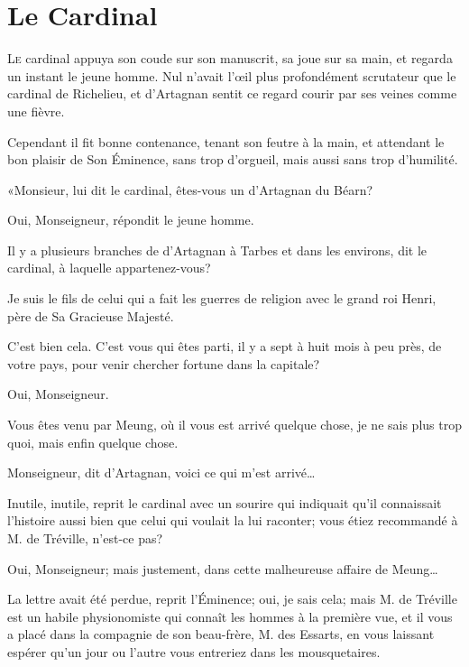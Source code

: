 
\chapter{Le Cardinal}

\lettrine{L}{e} cardinal appuya son coude sur son manuscrit, sa joue sur sa main, et regarda un instant le jeune homme. Nul n'avait l'œil plus profondément scrutateur que le cardinal de Richelieu, et d'Artagnan sentit ce regard courir par ses veines comme une fièvre. 

Cependant il fit bonne contenance, tenant son feutre à la main, et attendant le bon plaisir de Son Éminence, sans trop d'orgueil, mais aussi sans trop d'humilité. 

«Monsieur, lui dit le cardinal, êtes-vous un d'Artagnan du Béarn? 

\speak  Oui, Monseigneur, répondit le jeune homme. 

\speak  Il y a plusieurs branches de d'Artagnan à Tarbes et dans les environs, dit le cardinal, à laquelle appartenez-vous? 

\speak  Je suis le fils de celui qui a fait les guerres de religion avec le grand roi Henri, père de Sa Gracieuse Majesté. 

\speak  C'est bien cela. C'est vous qui êtes parti, il y a sept à huit mois à peu près, de votre pays, pour venir chercher fortune dans la capitale? 

\speak  Oui, Monseigneur. 

\speak  Vous êtes venu par Meung, où il vous est arrivé quelque chose, je ne sais plus trop quoi, mais enfin quelque chose. 

Monseigneur, dit d'Artagnan, voici ce qui m'est arrivé\dots 

\speak  Inutile, inutile, reprit le cardinal avec un sourire qui indiquait qu'il connaissait l'histoire aussi bien que celui qui voulait la lui raconter; vous étiez recommandé à M. de Tréville, n'est-ce pas? 

\speak  Oui, Monseigneur; mais justement, dans cette malheureuse affaire de Meung\dots 

\speak  La lettre avait été perdue, reprit l'Éminence; oui, je sais cela; mais M. de Tréville est un habile physionomiste qui connaît les hommes à la première vue, et il vous a placé dans la compagnie de son beau-frère, M. des Essarts, en vous laissant espérer qu'un jour ou l'autre vous entreriez dans les mousquetaires. 

